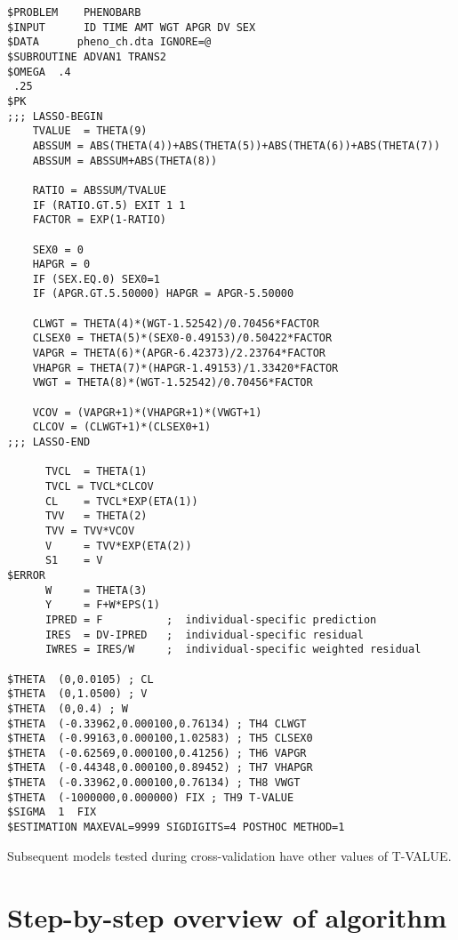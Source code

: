 \begin{verbatim}
$PROBLEM    PHENOBARB
$INPUT      ID TIME AMT WGT APGR DV SEX
$DATA      pheno_ch.dta IGNORE=@
$SUBROUTINE ADVAN1 TRANS2
$OMEGA  .4
 .25
$PK
;;; LASSO-BEGIN
    TVALUE  = THETA(9)
    ABSSUM = ABS(THETA(4))+ABS(THETA(5))+ABS(THETA(6))+ABS(THETA(7))
    ABSSUM = ABSSUM+ABS(THETA(8))

    RATIO = ABSSUM/TVALUE
    IF (RATIO.GT.5) EXIT 1 1
    FACTOR = EXP(1-RATIO)

    SEX0 = 0
    HAPGR = 0
    IF (SEX.EQ.0) SEX0=1
    IF (APGR.GT.5.50000) HAPGR = APGR-5.50000

    CLWGT = THETA(4)*(WGT-1.52542)/0.70456*FACTOR
    CLSEX0 = THETA(5)*(SEX0-0.49153)/0.50422*FACTOR
    VAPGR = THETA(6)*(APGR-6.42373)/2.23764*FACTOR
    VHAPGR = THETA(7)*(HAPGR-1.49153)/1.33420*FACTOR
    VWGT = THETA(8)*(WGT-1.52542)/0.70456*FACTOR

    VCOV = (VAPGR+1)*(VHAPGR+1)*(VWGT+1)
    CLCOV = (CLWGT+1)*(CLSEX0+1)
;;; LASSO-END

      TVCL  = THETA(1)
      TVCL = TVCL*CLCOV
      CL    = TVCL*EXP(ETA(1))
      TVV   = THETA(2)
      TVV = TVV*VCOV
      V     = TVV*EXP(ETA(2))
      S1    = V
$ERROR
      W     = THETA(3)
      Y     = F+W*EPS(1)
      IPRED = F          ;  individual-specific prediction
      IRES  = DV-IPRED   ;  individual-specific residual
      IWRES = IRES/W     ;  individual-specific weighted residual

$THETA  (0,0.0105) ; CL
$THETA  (0,1.0500) ; V
$THETA  (0,0.4) ; W
$THETA  (-0.33962,0.000100,0.76134) ; TH4 CLWGT
$THETA  (-0.99163,0.000100,1.02583) ; TH5 CLSEX0
$THETA  (-0.62569,0.000100,0.41256) ; TH6 VAPGR
$THETA  (-0.44348,0.000100,0.89452) ; TH7 VHAPGR
$THETA  (-0.33962,0.000100,0.76134) ; TH8 VWGT
$THETA  (-1000000,0.000000) FIX ; TH9 T-VALUE
$SIGMA  1  FIX
$ESTIMATION MAXEVAL=9999 SIGDIGITS=4 POSTHOC METHOD=1
\end{verbatim}

Subsequent models tested during cross-validation have other values of T-VALUE.


\section{Step-by-step overview of algorithm}


